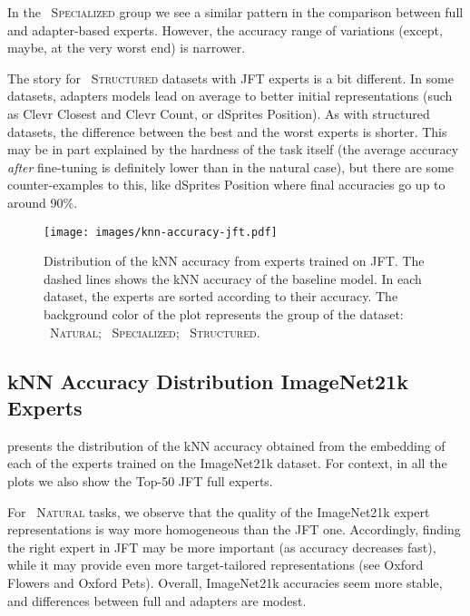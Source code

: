 \documentclass{article}
\newcommand{\naturalsym}{{\protect\scalebox{1.5}{\color{naturalcolor!50}}}}
\newcommand{\specializedsym}{{\protect\scalebox{1.5}{\color{specializedcolor!50}}}}
\newcommand{\structuredsym}{{\protect\scalebox{1.5}{\color{structuredcolor!50}}}}
\begin{document}
In the {\specializedsym~\textsc{Specialized}} group we see a similar pattern in the comparison between full and adapter-based experts.
However, the accuracy range of variations (except, maybe, at the very worst end) is narrower.


The story for {\structuredsym~\textsc{Structured}} datasets with JFT experts is a bit different.
In some datasets, adapters models lead on average to better initial representations (such as Clevr Closest and Clevr Count, or dSprites Position).
As with structured datasets, the difference between the best and the worst experts is shorter.
This may be in part explained by the hardness of the task itself (the average accuracy \emph{after} fine-tuning is definitely lower than in the natural case), but there are some counter-examples to this, like dSprites Position where final accuracies go up to around 90\%.



\begin{figure}[tb]
\centering
\texttt{[image: images/knn-accuracy-jft.pdf]}
\caption{Distribution of the kNN accuracy from experts trained on JFT. 
The dashed lines shows the kNN accuracy of the baseline model. 
In each dataset, the experts are sorted according to their accuracy.
The background color of the plot represents the group of the dataset:
\naturalsym~\textsc{Natural}; 
\specializedsym~\textsc{Specialized}; 
\structuredsym~\textsc{Structured}.
\label{fig:knn_accuracy_jft_distribution}}
\end{figure}


\clearpage
\subsection{kNN Accuracy Distribution ImageNet21k Experts}

 presents the distribution of the kNN 
accuracy obtained from the embedding of each of the experts trained on the ImageNet21k dataset.
For context, in all the plots we also show the Top-50 JFT full experts.

For {\naturalsym~\textsc{Natural}} tasks, we observe that the quality of the ImageNet21k expert 
representations is way more homogeneous than the JFT one.
Accordingly, finding the right expert in JFT may be more important (as accuracy decreases fast),
while it may provide even more target-tailored representations (see Oxford Flowers and Oxford Pets).
Overall, ImageNet21k accuracies seem more stable, and differences between full and adapters are modest.
\end{document}
